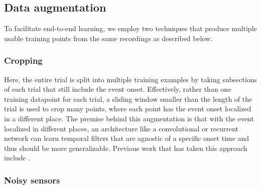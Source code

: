 \documentclass[utf8]{frontiersSCNS} %
\begin{document}
\subsection{Data augmentation}

To facilitate end-to-end learning, we employ two techniques that produce multiple usable training points from the same recordings as described below. 

\subsubsection{Cropping}

Here, the entire trial is split into multiple training examples by taking subsections of each trial that still include the event onset. Effectively, rather than one training datapoint for each trial, a sliding window smaller than the length of the trial is used to crop many points, where each point has the event onset localized in a different place. The premise behind this augmentation is that with the event localized in different places, an architecture like a convolutional or recurrent network can learn temporal filters that are agnostic of a specific onset time and thus should be more generalizable. Previous work that has taken this approach include \cite{Schirrmeister2017, Sun}. %



\subsubsection{Noisy sensors}
\end{document}
